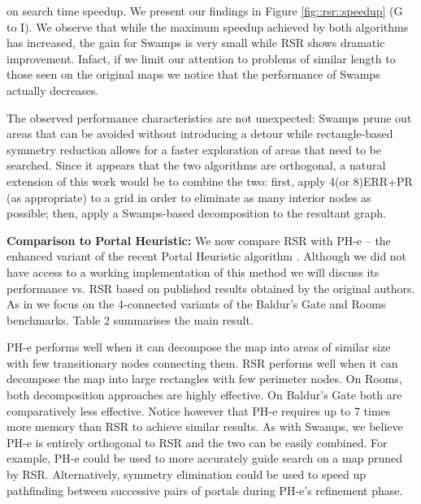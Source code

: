 on search time speedup.  We present our findings in  Figure \ref{fig::rsr::speedup} (G
to I).  We observe that while the maximum speedup achieved by both algorithms
has increased, the gain for Swamps is very small while RSR shows dramatic
improvement.  Infact, if we limit our attention to problems of similar length to
those seen on the original maps we notice that the performance of Swamps
actually decreases.
\par
The observed performance characteristics are not unexpected: Swamps prune out
areas that can be avoided without introducing a detour while rectangle-based
symmetry reduction allows for a faster exploration of areas that need to be
searched.  Since it appears that the two algorithms are orthogonal, a natural
extension of this work would be to combine the two: first, apply 4(or 8)ERR+PR
(as appropriate) to a grid in order to eliminate as many interior nodes as
possible; then, apply a Swamps-based decomposition to the resultant graph.



\textbf{Comparison to Portal Heuristic:}
We now compare RSR with PH-e -- the enhanced variant of the recent 
Portal Heuristic algorithm \cite{goldenberg10}.
Although we did not have access to a working implementation of this method we
will discuss its performance vs. RSR based on published results obtained by the
original authors. As in \cite{goldenberg10} we focus on the 4-connected variants 
of the Baldur's Gate and Rooms benchmarks.
Table 2 summarises the main result.
\par
PH-e performs well when it can decompose the map into areas of similar size with
few transitionary nodes connecting them.
RSR performs well when it can decompose the map into large rectangles with few
perimeter nodes.
On Rooms, both decomposition approaches are highly effective. 
On Baldur's Gate both are comparatively less effective.
Notice however that PH-e requires up to 7 times more memory than RSR to achieve
similar results.
As with Swamps, we believe PH-e is entirely orthogonal to RSR and the two can be 
easily combined. For example, PH-e could be used to more accurately guide search
on a map pruned by RSR. Alternatively, symmetry elimination could be used to 
speed up pathfinding between successive pairs of portals during PH-e's refinement phase.

